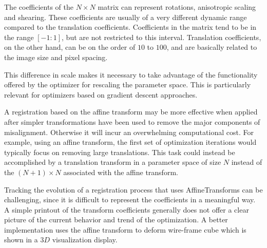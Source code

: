 The coefficients of the $N \times N$ matrix can represent rotations,
anisotropic scaling and shearing. These coefficients are usually of a very
different dynamic range compared to the translation
coefficients. Coefficients in the matrix tend to be in the range $[-1:1]$, but
are not restricted to this interval.  Translation coefficients, on the other
hand, can be on the order of $10$ to $100$, and are basically related to the
image size and pixel spacing.

This difference in scale makes it necessary to take advantage of the
functionality offered by the optimizer for rescaling the parameter
space. This is particularly relevant for optimizers based on gradient descent
approaches.

A registration based on the affine transform may be more effective when
applied after simpler transformations have been used to remove the major
components of misalignment. Otherwise it will incur an overwhelming
computational cost. For example, using an affine transform, the first set of
optimization iterations would typically focus on removing large
translations. This task could instead be accomplished by a translation
transform in a parameter space of size $N$ instead of the $(N+1) \times N$
associated with the affine transform.

Tracking the evolution of a registration process that uses
AffineTransforms can be challenging, since it is difficult to
represent the coefficients in a meaningful way.  A simple printout of the
transform coefficients generally does not offer a clear picture of the current
behavior and trend of the optimization.  A better implementation uses
the affine transform to deform wire-frame cube which is shown in a $3D$
visualization display.


